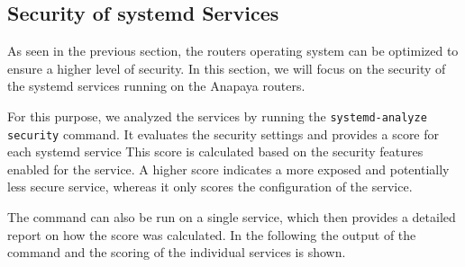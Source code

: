 \subsection{Security of systemd Services}
\label{sec:systemd-services}
As seen in the previous section, the routers operating system can be optimized to ensure a higher level of security.
In this section, we will focus on the security of the systemd services running on the Anapaya routers.

For this purpose, we analyzed the services by running the \texttt{systemd-analyze security} command.
It evaluates the security settings and provides a score for each systemd service
This score is calculated based on the security features enabled for the service.
A higher score indicates a more exposed and potentially less secure service, whereas it only scores the configuration of the service.

The command can also be run on a single service, which then provides a detailed report on how the score was calculated.
In the following the output of the command and the scoring of the individual services is shown.


